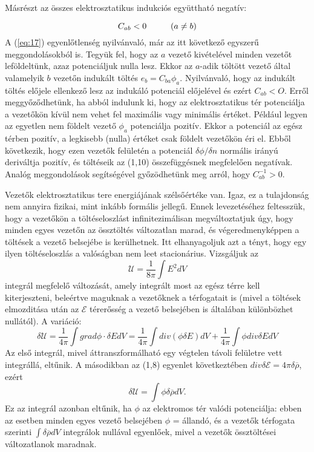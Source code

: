 \documentclass{article}
\begin{document}
Másrészt az összes elektrosztatikus indukciós együttható negatív:

\begin{equation} \label{eq:17}
    C_{ab} < 0 \hspace{1 cm} (a \neq b )
\end{equation}
A (\ref{eq:17}) egyenlőtlenség nyilvánvaló, már az itt következő egyszerű meggondolásokból is. Tegyük fel, hogy az $a$ vezető kivételével minden vezetőt leföldeltünk, azaz potenciáljuk nulla lesz. Ekkor az $a$-adik töltött vezető által valamelyik $b$ vezetőn indukált töltés $e_b = C_{ba}\phi_a$. Nyilvánvaló, hogy az indukált töltés előjele ellenkező lesz az indukáló potenciál előjelével és ezért $C_{ab} < O$. Erről meggyőződhetünk, ha abból indulunk ki, hogy az elektrosztatikus tér potenciálja a vezetőkön kívül nem vehet fel maximális vagy minimális értéket. Például legyen az egyetlen nem földelt vezető $\phi_a$ potenciálja pozitív. Ekkor a potenciál az egész térben pozitív, a legkisebb (nulla) értéket csak földelt vezetőkön éri el. Ebből következik, hogy ezen vezetők felületén a potenciál $\delta \phi / \delta n$ normális irányú deriváltja pozitív, és töltéseik az (1,10) összefüggésnek megfelelően negatívak. Analóg meggondolások segítségével győzödhetünk meg arról, hogy $C_{ab}^{-1} > 0$.

Vezetők elektrosztatikus tere energiájának szélsőértéke van. Igaz, ez a tulajdonság nem annyira fizikai, mint inkább formális jellegű. Ennek levezetéséhez feltesszük, hogy a vezetőkön a töltéseloszlást infinitezimálisan megváltoztatjuk úgy, hogy minden egyes vezetőn az össztöltés változatlan marad, és végeredmenyképpen a töltések a vezető belsejébe is kerülhetnek. Itt elhanyagoljuk azt a tényt, hogy egy ilyen töltéseloszlás a valóságban nem leet stacionárius. Vizsgáljuk az
\begin{equation} \label{eq:18}
    \mathcal{U} = \frac{1}{8 \pi} \int E^2dV
\end{equation}
integrál megfelelő változását, amely integrált most az egész térre kell kiterjeszteni, beleértve maguknak a vezetőknek a térfogatait is (mivel a töltések elmozditása után az $\mathcal{E}$ térerősség a vezető belsejében is általában különbözhet nullától). A variáció:
\begin{equation} \label{eq:19}
    \delta \mathcal{U} = \frac{1}{4 \pi} \int grad \phi \cdot \delta EdV = \frac{1}{4\pi} \int div(\phi \delta E)dV + \frac{1}{4\pi} \int \phi div \delta EdV
\end{equation}
Az első integrál, mivel áttranszformálható egy végtelen távoli felületre vett integrállá, eltűnik. A másodikban az (1,8) egyenlet következtében $div \delta \mathcal{E} = 4 \pi \delta \overline\rho$, ezért
\begin{equation} \label{eq:20}
    \delta \mathcal{U} = \int \phi \delta \overline{\rho}dV.
\end{equation}
Ez az integrál azonban eltűnik, ha $\phi$ az elektromos tér valódi potenciálja: ebben az esetben minden egyes vezető belsejében $\phi$ = állandó, és a vezetők térfogata szerinti $\int \delta \overline{\rho} dV$ integrálok nullával egyenlőek, mivel a vezetők össztöltései változatlanok maradnak.
\end{document}
